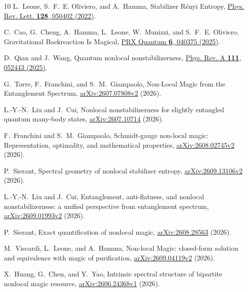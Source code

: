 \documentclass[11pt]{article}
\begin{document}
\begin{thebibliography}{10}
L.~Leone, S.~F.~E. Oliviero, and A.~Hamma,
Stabilizer R\'enyi Entropy,
\href{https://doi.org/10.1103/PhysRevLett.128.050402}{Phys. Rev. Lett. \textbf{128}, 050402 (2022)}.

C.~Cao, G.~Cheng, A.~Hamma, L.~Leone, W.~Munizzi, and S.~F.~E. Oliviero,
Gravitational Backreaction Is Magical,
\href{https://doi.org/10.1103/z3vr-w5c5}{PRX Quantum \textbf{6}, 040375 (2025)}.

D.~Qian and J.~Wang,
Quantum nonlocal nonstabilizerness,
\href{https://doi.org/10.1103/PhysRevA.111.052443}{Phys. Rev. A \textbf{111}, 052443 (2025)}.

G.~Torre, F.~Franchini, and S.~M.~Giampaolo,
Non-Local Magic from the Entanglement Spectrum,
\href{https://arxiv.org/abs/2607.07808v2}{arXiv:2607.07808v2} (2026).

L.-Y.-N.~Liu and J.~Cui,
Nonlocal nonstabilizerness for slightly entangled quantum many-body states,
\href{https://arxiv.org/abs/2607.10714}{arXiv:2607.10714} (2026).

F.~Franchini and S.~M.~Giampaolo,
Schmidt-gauge non-local magic: Representation, optimality, and mathematical properties,
\href{https://arxiv.org/abs/2608.02745v2}{arXiv:2608.02745v2} (2026).

P.~Sierant,
Spectral geometry of nonlocal stabilizer entropy,
\href{https://arxiv.org/abs/2609.13106v2}{arXiv:2609.13106v2} (2026).

L.-Y.-N.~Liu and J.~Cui,
Entanglement, anti-flatness, and nonlocal nonstabilizerness:
a unified perspective from entanglement spectrum,
\href{https://arxiv.org/abs/2609.01993v2}{arXiv:2609.01993v2} (2026).

P.~Sierant,
Exact quantification of nonlocal magic,
\href{https://arxiv.org/abs/2608.28563}{arXiv:2608.28563} (2026).

M.~Viscardi, L.~Leone, and A.~Hamma,
Non-local Magic: closed-form solution and equivalence with magic of purification,
\href{https://arxiv.org/abs/2609.04119v2}{arXiv:2609.04119v2} (2026).

X.~Huang, G.~Chen, and Y.~Yao,
Intrinsic spectral structure of bipartite nonlocal magic resource,
\href{https://arxiv.org/abs/2606.24368v1}{arXiv:2606.24368v1} (2026).
\end{thebibliography}
\end{document}
